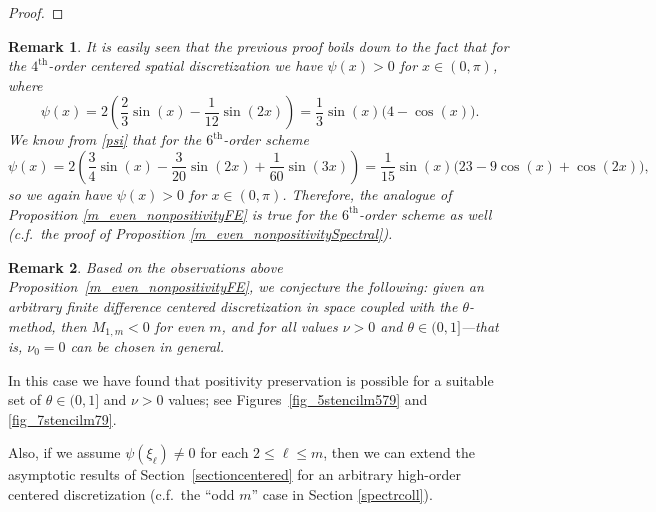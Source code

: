 \documentclass[a4paper]{article}
\newtheorem{remark}{Remark}
\begin{document}
\begin{description}[style=unboxed,leftmargin=0cm]
\begin{proof}
\end{proof}
\begin{remark}\label{6th_order_scheme} It is easily seen that the previous proof boils down to the fact that for the $4^\text{th}$-order centered spatial discretization we have $\psi(x)>0$ for $x\in(0,\pi)$, where
\[
\psi(x)=2 \left(\frac{2}{3}\sin (x)-\frac{1}{12} \sin (2 x)\right)=\frac{1}{3} \sin (x) \bigl(4-\cos (x)\bigr).
\]
We know from \eqref{psi} that for the $6^\text{th}$-order scheme
\[
\psi(x) = 2 \left(\frac{3}{4}\sin (x)-\frac{3}{20} \sin (2 x)+\frac{1}{60} \sin (3 x)\right) =
	\frac{1}{15} \sin (x) \bigl(23-9\cos (x)+\cos (2x)\bigr),
\]
so we again have $\psi(x)>0$ for $x\in(0,\pi)$. Therefore, the analogue of Proposition \ref{m_even_nonpositivityFE} is true for the $6^\text{th}$-order scheme as well (c.f.~the proof of Proposition \ref{m_even_nonpositivitySpectral}).
\end{remark}
\begin{remark}
	Based on the observations above Proposition~\ref{m_even_nonpositivityFE}, we conjecture the following:
	given an arbitrary finite difference centered discretization in space coupled with the $\theta$-method, then
	$M_{1,m} < 0$ for even $m$, and for \emph{all} values $\nu > 0$ and $\theta \in (0,1]$---that is, $\nu_0=0$ can be chosen in general.
\end{remark}
\item [{Case 2:} $m$ is {odd}.] In this case we have found that positivity preservation is possible for a suitable
set of $\theta\in(0,1]$ and $\nu>0$ values; see  Figures~\ref{fig_5stencilm579} and \ref{fig_7stencilm79}.

Also, if we assume $\psi(\xi_\ell) \ne 0$ for each $2\le\ell\le m$, then we can extend the asymptotic results of
Section~\ref{sectioncentered} for an arbitrary high-order centered discretization (c.f.~the ``odd $m$'' case in Section \ref{spectrcoll}).
\end{description}
\end{document}
